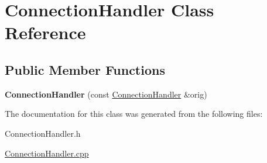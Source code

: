 \hypertarget{class_connection_handler}{}\section{Connection\+Handler Class Reference}
\label{class_connection_handler}
\subsection*{Public Member Functions}
\begin{DoxyCompactItemize}
\item 
\hypertarget{class_connection_handler_af7acaf9817e443df083bd152bec95c0a}{}{\bfseries Connection\+Handler} (const \hyperlink{class_connection_handler}{Connection\+Handler} \&orig)\label{class_connection_handler_af7acaf9817e443df083bd152bec95c0a}

\end{DoxyCompactItemize}


The documentation for this class was generated from the following files\+:\begin{DoxyCompactItemize}
\item 
Connection\+Handler.\+h\item 
\hyperlink{_connection_handler_8cpp}{Connection\+Handler.\+cpp}\end{DoxyCompactItemize}
